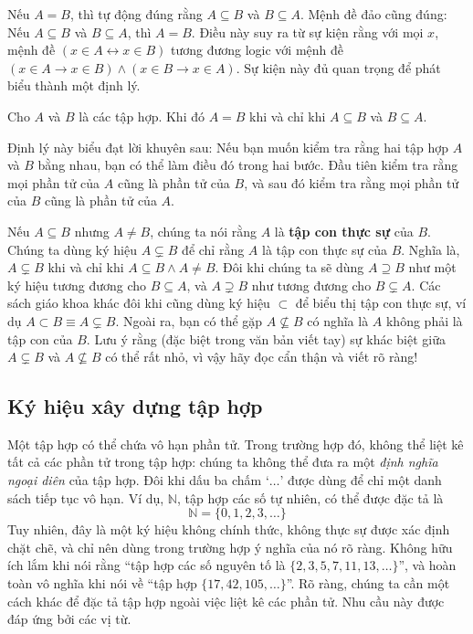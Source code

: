 Nếu $A = B$, thì tự động đúng rằng $A \subseteq B$ và $B \subseteq A$. Mệnh đề đảo cũng đúng: Nếu $A \subseteq B$ và $B \subseteq A$, thì $A = B$. Điều này suy ra từ sự kiện rằng với mọi $x$, mệnh đề $(x \in A \leftrightarrow x \in B)$ tương đương logic với mệnh đề $(x \in A \to x \in B) \land (x \in B \to x \in A)$. Sự kiện này đủ quan trọng để phát biểu thành một định lý.

\begin{theorem}
\label{thm:4.1}
Cho $A$ và $B$ là các tập hợp. Khi đó $A = B$ khi và chỉ khi $A \subseteq B$ và $B \subseteq A$.
\end{theorem}

Định lý này biểu đạt lời khuyên sau: Nếu bạn muốn kiểm tra rằng hai tập hợp $A$ và $B$ bằng nhau, bạn có thể làm điều đó trong hai bước. Đầu tiên kiểm tra rằng mọi phần tử của $A$ cũng là phần tử của $B$, và sau đó kiểm tra rằng mọi phần tử của $B$ cũng là phần tử của $A$.

Nếu $A \subseteq B$ nhưng $A \neq B$, chúng ta nói rằng $A$ là \textbf{tập con thực sự} của $B$. Chúng ta dùng ký hiệu $A \subsetneq B$ để chỉ rằng $A$ là tập con thực sự của $B$. Nghĩa là, $A \subsetneq B$ khi và chỉ khi $A \subseteq B \land A \neq B$. Đôi khi chúng ta sẽ dùng $A \supseteq B$ như một ký hiệu tương đương cho $B \subseteq A$, và $A \supsetneq B$ như tương đương cho $B \subsetneq A$. Các sách giáo khoa khác đôi khi cũng dùng ký hiệu $\subset$ để biểu thị tập con thực sự, ví dụ $A \subset B \equiv A \subsetneq B$. Ngoài ra, bạn có thể gặp $A \not\subseteq B$ có nghĩa là $A$ không phải là tập con của $B$. Lưu ý rằng (đặc biệt trong văn bản viết tay) sự khác biệt giữa $A \subsetneq B$ và $A \not\subseteq B$ có thể rất nhỏ, vì vậy hãy đọc cẩn thận và viết rõ ràng!

\subsection{Ký hiệu xây dựng tập hợp}

Một tập hợp có thể chứa vô hạn phần tử. Trong trường hợp đó, không thể liệt kê tất cả các phần tử trong tập hợp: chúng ta không thể đưa ra một \textit{định nghĩa ngoại diên} của tập hợp. Đôi khi dấu ba chấm `$\ldots$' được dùng để chỉ một danh sách tiếp tục vô hạn. Ví dụ, $\mathbb{N}$, tập hợp các số tự nhiên, có thể được đặc tả là
\[
\mathbb{N} = \{0, 1, 2, 3, \ldots\}
\]
Tuy nhiên, đây là một ký hiệu không chính thức, không thực sự được xác định chặt chẽ, và chỉ nên dùng trong trường hợp ý nghĩa của nó rõ ràng. Không hữu ích lắm khi nói rằng ``tập hợp các số nguyên tố là $\{2, 3, 5, 7, 11, 13, \ldots\}$'', và hoàn toàn vô nghĩa khi nói về ``tập hợp $\{17, 42, 105, \ldots\}$''. Rõ ràng, chúng ta cần một cách khác để đặc tả tập hợp ngoài việc liệt kê các phần tử. Nhu cầu này được đáp ứng bởi các vị từ.


